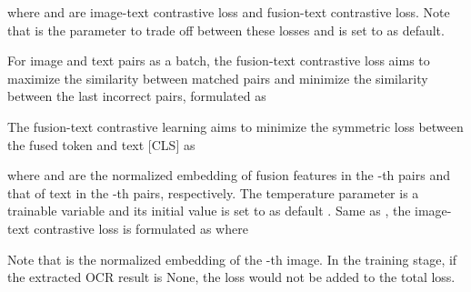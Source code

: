 \documentclass[10pt,twocolumn,letterpaper]{article}
\begin{document}
where  and  are image-text contrastive loss and fusion-text contrastive loss. Note that  is the parameter to trade off between these losses and is set to  as default. 

For  image and text pairs as a batch, the fusion-text contrastive loss aims to maximize the similarity between  matched pairs and minimize the similarity between the last  incorrect pairs, formulated as\vspace{-0.5em} 

The fusion-text contrastive learning aims to minimize the symmetric loss between the fused token and text [CLS] as\vspace{-0.5em}

where  and  are the normalized embedding of fusion features in the -th pairs and that of text in the -th pairs, respectively. The temperature parameter  is a trainable variable and its initial value is set to  as default \cite{ALIGN}. 
Same as , the image-text contrastive loss is formulated as \vspace{-0.5em}
\vspace{-0.5em}
where\vspace{-1em}

Note that  is the normalized embedding of the -th image. In the training stage, if the extracted OCR result is None, the  loss would not be added to the total loss. 
\end{document}
